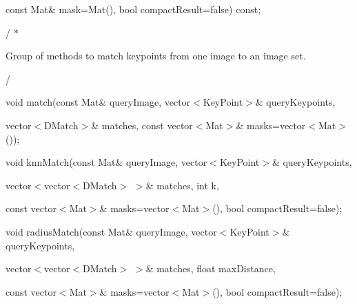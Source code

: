 {\ttfamily }

{\ttfamily const Mat\& mask=Mat(), bool compact\+Result=false) const;}

{\ttfamily }

{\ttfamily }

{\ttfamily / $\ast$}

{\ttfamily  
\begin{DoxyItemize}
\item Group of methods to match keypoints from one image to an image set. 
\item / 
\end{DoxyItemize}}

{\ttfamily }

{\ttfamily void match(const Mat\& query\+Image, vector$<$\+Key\+Point$>$\& query\+Keypoints,}

{\ttfamily }

{\ttfamily }

{\ttfamily vector$<$\+D\+Match$>$\& matches, const vector$<$\+Mat$>$\& masks=vector$<$\+Mat$>$());}

{\ttfamily }

{\ttfamily }

{\ttfamily void knn\+Match(const Mat\& query\+Image, vector$<$\+Key\+Point$>$\& query\+Keypoints,}

{\ttfamily }

{\ttfamily }

{\ttfamily vector$<$vector$<$\+D\+Match$>$ $>$\& matches, int k,}

{\ttfamily }

{\ttfamily }

{\ttfamily const vector$<$\+Mat$>$\& masks=vector$<$\+Mat$>$(), bool compact\+Result=false);}

{\ttfamily }

{\ttfamily }

{\ttfamily void radius\+Match(const Mat\& query\+Image, vector$<$\+Key\+Point$>$\& query\+Keypoints,}

{\ttfamily }

{\ttfamily }

{\ttfamily vector$<$vector$<$\+D\+Match$>$ $>$\& matches, float max\+Distance,}

{\ttfamily }

{\ttfamily }

{\ttfamily const vector$<$\+Mat$>$\& masks=vector$<$\+Mat$>$(), bool compact\+Result=false);}

{\ttfamily }

{\ttfamily }


